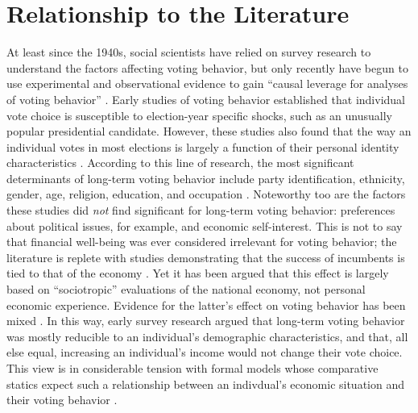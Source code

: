\section{Relationship to the Literature}
At least since the 1940s, social scientists have relied on survey research to understand the factors affecting voting behavior, but only recently have begun to use experimental and observational evidence to gain ``causal leverage for analyses of voting behavior'' \parencite{Bartels2010}. Early studies of voting behavior established that individual vote choice is susceptible to election-year specific shocks, such as an unusually popular presidential candidate. However, these studies also found that the way an individual votes in most elections is largely a function of their personal identity characteristics \parencite{Converse1966}. According to this line of research, the most significant determinants of long-term voting behavior include party identification, ethnicity, gender, age, religion, education, and occupation \parencite{Lazarsfeld1948,Berelson1954,Campbell1960,Stanley2006a}. Noteworthy too are the factors these studies did \textit{not} find significant for long-term voting behavior: preferences about political issues, for example, and economic self-interest. This is not to say that financial well-being was ever considered irrelevant for voting behavior; the literature is replete with studies demonstrating that the success of incumbents is tied to that of the economy \parencite{Tufte1975,Meltzer1975,Hibbs1987}. Yet it has been argued that this effect is largely based on ``sociotropic'' evaluations of the national economy, not personal economic experience. Evidence for the latter's effect on voting behavior has been mixed \parencite{Linn2010}. In this way, early survey research argued that long-term voting behavior was mostly reducible to an individual's demographic characteristics, and that, all else equal, increasing an individual's income would not change their vote choice. This view is in considerable tension with formal models whose comparative statics expect such a relationship between an indivdual's economic situation and their voting behavior \parencite[e.g.,][]{Romer1975,Roberts1977,Meltzer1981}.


